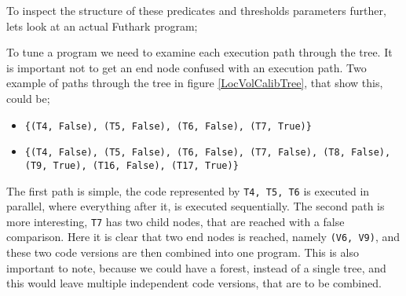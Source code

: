 To inspect the structure of these predicates and thresholds parameters further, lets look at an actual Futhark program;
\begin{center}
	\centering
	
	\label{LocVolCalibTree}
\end{center}
\noindent To tune a program we need to examine each execution path through the tree. It is important not to get an end node confused with an execution path. Two example of paths through the tree in figure \ref{LocVolCalibTree}, that show this, could be;
\begin{itemize}
	\item \texttt{\{(T4, False), (T5, False), (T6, False), (T7, True)\}}
	\item \texttt{\{(T4, False), (T5, False), (T6, False), (T7, False), (T8, False), (T9, True), (T16, False), (T17, True)\}}
\end{itemize}  
The first path is simple, the code represented by \texttt{T4, T5, T6} is executed in parallel, where everything after it, is executed sequentially. The second path is more interesting, \texttt{T7} has two child nodes, that are reached with a false comparison. Here it is clear that two end nodes is reached, namely \texttt{(V6, V9)}, and these two code versions are then combined into one program. This is also important to note, because we could have a forest, instead of a single tree, and this would leave multiple independent code versions, that are to be combined.


